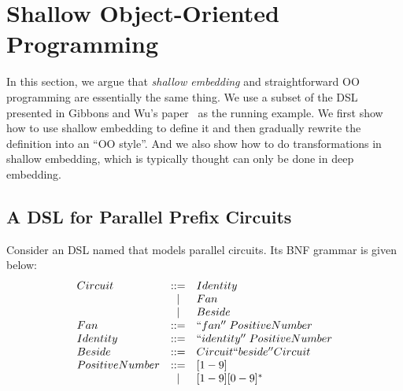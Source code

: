 \section{Shallow Object-Oriented Programming}

\begin{comment}
Weixin writes this part.

Argue that shallow embeddings and straightforward OO 
programs are essentially the same thing. 

Start from a simple shallow DSL in Haskell, 
and iterate throught it until you reach a form 
that looks like an OO program.

Show how todo transformations in Shallow embeddings
using the insight of how to do transformations in OO
programs.

Show the correponding Java programs and the Java program 
with transformation that we can port back to Haskell.

Shallow embedding interpreter pattern
Deep embedding visitor pattern
\end{comment}

In this section, we argue that \emph{shallow embedding} and straightforward OO
programming are essentially the same thing. We use a subset
of the DSL presented in Gibbons and Wu's paper~\cite{} as the running example.
We first show how to use shallow embedding to define it and then gradually
rewrite the definition into an ``OO style''. And we also show how to do
transformations in shallow embedding, which is typically thought can only be
done in deep embedding.

\subsection{A DSL for Parallel Prefix Circuits}
Consider an DSL named \dsl that models parallel circuits.
Its BNF grammar is given below:
$$
\begin{array}{lcl}
Circuit & ::= & Identity \\
 & \mid & Fan \\
 & \mid & Beside \\
Fan & ::= & ``fan''\; PositiveNumber \\
Identity & ::= & ``identity''\;  PositiveNumber \\
Beside & ::= & Circuit ``beside'' Circuit \\
PositiveNumber & ::= & [1-9] \\
     & \mid & [1-9][0-9]^* \\
\end{array}
$$

